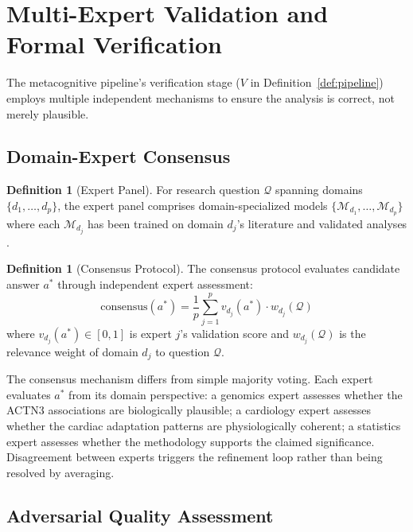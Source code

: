 \documentclass[10pt,twocolumn]{article}
\theoremstyle{definition}
\newtheorem{definition}[theorem]{Definition}
\theoremstyle{remark}
\newcommand{\question}{\mathcal{Q}}
\newcommand{\model}{\mathcal{M}}
\begin{document}
\section{Multi-Expert Validation and Formal Verification}
\label{sec:validation}

The metacognitive pipeline's verification stage ($V$ in Definition~\ref{def:pipeline}) employs multiple independent mechanisms to ensure the analysis is correct, not merely plausible.

\subsection{Domain-Expert Consensus}

\begin{definition}[Expert Panel]
For research question $\question$ spanning domains $\{d_1, \ldots, d_p\}$, the expert panel comprises domain-specialized models $\{\model_{d_1}, \ldots, \model_{d_p}\}$ where each $\model_{d_j}$ has been trained on domain $d_j$'s literature and validated analyses \cite{lee2020biobert,beltagy2019scibert}.
\end{definition}

\begin{definition}[Consensus Protocol]
The consensus protocol evaluates candidate answer $a^*$ through independent expert assessment:
\begin{equation}
\text{consensus}(a^*) = \frac{1}{p} \sum_{j=1}^{p} v_{d_j}(a^*) \cdot w_{d_j}(\question)
\end{equation}
where $v_{d_j}(a^*) \in [0,1]$ is expert $j$'s validation score and $w_{d_j}(\question)$ is the relevance weight of domain $d_j$ to question $\question$.
\end{definition}

The consensus mechanism differs from simple majority voting. Each expert evaluates $a^*$ from its domain perspective: a genomics expert assesses whether the ACTN3 associations are biologically plausible; a cardiology expert assesses whether the cardiac adaptation patterns are physiologically coherent; a statistics expert assesses whether the methodology supports the claimed significance. Disagreement between experts triggers the refinement loop rather than being resolved by averaging.

\subsection{Adversarial Quality Assessment}
\end{document}
